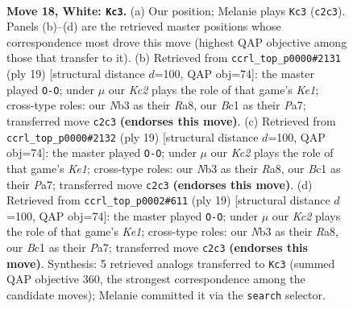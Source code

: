 \documentclass[11pt]{article}
\begin{document}
\clearpage

\begin{figure}[p]\centering
\begin{subfigure}{0.46\textwidth}\centering
\resizebox{\linewidth}{!}{%
\newchessgame
\chessboard[
  setfen={r1b2kr1/1p1qbp1p/p3n1p1/2Ppn3/8/1N4N1/PPK2PPP/1RBQ1B1R w - - 4 18},
  showmover=false,
  pgfstyle=straightmove, color=movearrow, markmove={c2-c3}
]}
\caption{}
\end{subfigure}\hfill
\begin{subfigure}{0.46\textwidth}\centering
\resizebox{\linewidth}{!}{%
\newchessgame
\chessboard[
  setfen={r1bqk2r/pp2bppp/1nn1p3/8/P2P4/2NB1N2/1P3PPP/R1BQ1RK1 b kq - 4 10},
  showmover=false,
  pgfstyle=straightmove, color=movearrow, markmove={e8-g8}
]}
\caption{}
\end{subfigure}
\\[4pt]
\begin{subfigure}{0.46\textwidth}\centering
\resizebox{\linewidth}{!}{%
\newchessgame
\chessboard[
  setfen={r1bqk2r/pp2bppp/1nn1p3/8/P2P4/2NB1N2/1P3PPP/R1BQ1RK1 b kq - 3 10},
  showmover=false,
  pgfstyle=straightmove, color=movearrow, markmove={e8-g8}
]}
\caption{}
\end{subfigure}\hfill
\begin{subfigure}{0.46\textwidth}\centering
\resizebox{\linewidth}{!}{%
\newchessgame
\chessboard[
  setfen={r1bqk2r/pp2bppp/1nn1p3/8/P2P4/2NB1N2/1P3PPP/R1BQ1RK1 b kq - 4 10},
  showmover=false,
  pgfstyle=straightmove, color=movearrow, markmove={e8-g8}
]}
\caption{}
\end{subfigure}
\caption{\textbf{Move 18, White: \texttt{Kc3}.} (a) Our position; Melanie plays \texttt{Kc3} (\texttt{c2c3}). Panels (b)--(d) are the retrieved master positions whose correspondence most drove this move (highest QAP objective among those that transfer to it). (b) Retrieved from \texttt{ccrl\_top\_p0000\#2131} (ply 19) [structural distance $d$=100, QAP obj=74]: the master played \texttt{O-O}; under $\mu$ our \emph{Kc2} plays the role of that game's \emph{Ke1}; cross-type roles: our \emph{N}b3 as their \emph{R}a8, our \emph{B}c1 as their \emph{P}a7; transferred move \texttt{c2c3} \textbf{(endorses this move)}. (c) Retrieved from \texttt{ccrl\_top\_p0000\#2132} (ply 19) [structural distance $d$=100, QAP obj=74]: the master played \texttt{O-O}; under $\mu$ our \emph{Kc2} plays the role of that game's \emph{Ke1}; cross-type roles: our \emph{N}b3 as their \emph{R}a8, our \emph{B}c1 as their \emph{P}a7; transferred move \texttt{c2c3} \textbf{(endorses this move)}. (d) Retrieved from \texttt{ccrl\_top\_p0002\#611} (ply 19) [structural distance $d$=100, QAP obj=74]: the master played \texttt{O-O}; under $\mu$ our \emph{Kc2} plays the role of that game's \emph{Ke1}; cross-type roles: our \emph{N}b3 as their \emph{R}a8, our \emph{B}c1 as their \emph{P}a7; transferred move \texttt{c2c3} \textbf{(endorses this move)}. Synthesis: 5 retrieved analogs transferred to \texttt{Kc3} (summed QAP objective 360, the strongest correspondence among the candidate moves); Melanie committed it via the \texttt{search} selector.}
\label{fig:thought-m34}
\end{figure}
\end{document}
